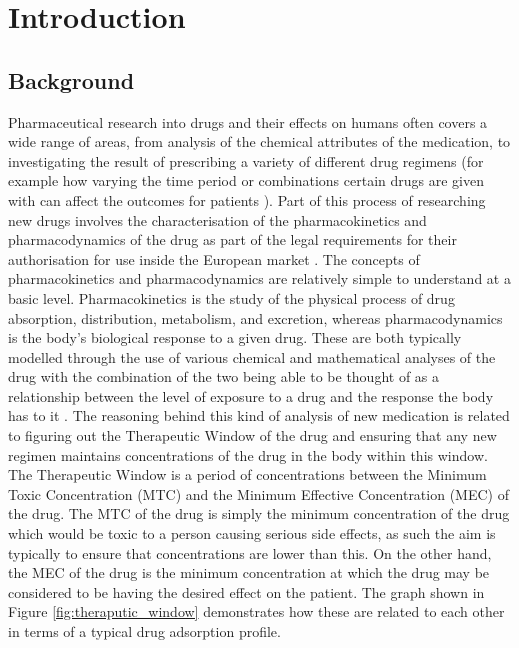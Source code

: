 \section{Introduction}

\subsection{Background} \label{background}
Pharmaceutical research into drugs and their effects on humans often covers a wide range of areas, from analysis of the chemical attributes of the medication, to investigating the result of prescribing a variety of different drug regimens (for example how varying the time period or combinations certain drugs are given with can affect the outcomes for patients \cite{doi:10.1056/NEJMoa011954}). Part of this process of researching new drugs involves the characterisation of the pharmacokinetics and pharmacodynamics of the drug as part of the legal requirements for their authorisation for use inside the European market \cite{2001_83_EC_Directive_For_Pharmacokinetic_Characterisation}. The concepts of pharmacokinetics and pharmacodynamics are relatively simple to understand at a basic level. Pharmacokinetics is the study of the physical process of drug absorption, distribution, metabolism, and excretion, whereas pharmacodynamics is the body's biological response to a given drug. These are both typically modelled through the use of various chemical and mathematical analyses of the drug with the combination of the two being able to be thought of as a relationship between the level of exposure to a drug and the response the body has to it \cite{holford1982kinetics}. The reasoning behind this kind of analysis of new medication is related to figuring out the Therapeutic Window of the drug and ensuring that any new regimen maintains concentrations of the drug in the body within this window. The Therapeutic Window is a period of concentrations between the Minimum Toxic Concentration (MTC) and the Minimum Effective Concentration (MEC) of the drug. The MTC of the drug is simply the minimum concentration of the drug which would be toxic to a person causing serious side effects, as such the aim is typically to ensure that concentrations are lower than this. On the other hand, the MEC of the drug is the minimum concentration at which the drug may be considered to be having the desired effect on the patient. The graph shown in Figure \ref{fig:theraputic_window} demonstrates how these are related to each other in terms of a typical drug adsorption profile. 
	
